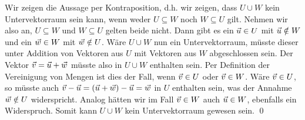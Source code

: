 \documentclass{article}
\begin{document}
\newpar
Wir zeigen die Aussage per Kontraposition, d.h. wir zeigen, dass $U \cup W$ kein Untervektorraum sein kann, wenn weder $U \subseteq W$ noch $W \subseteq U$ gilt.
\newpar
Nehmen wir also an, $U \subseteq W$ und $W \subseteq U$ gelten beide nicht. Dann gibt es ein $\vec{u} \in U$ mit $\vec{u} \notin W$ und ein $\vec{w} \in W$ mit $\vec{w} \notin U$.
\newpar
Wäre $U \cup W$ nun ein Untervektorraum, müsste dieser unter Addition von Vektoren aus $U$ mit Vektoren aus $W$ abgeschlossen sein. Der Vektor $\vec{v} = \vec{u} + \vec{w}$ müsste also in $U \cup W$ enthalten sein. Per Definition der Vereinigung von Mengen ist dies der Fall, wenn $\vec{v} \in U$ oder $\vec{v} \in W$.
\newpar
Wäre $\vec{v} \in U$, so müsste auch $\vec{v} - \vec{u} = (\vec{u} + \vec{w}) - \vec{u} = \vec{w}$ in $U$ enthalten sein, was der Annahme $\vec{w} \notin U$ widerspricht. Analog hätten wir im Fall $\vec{v} \in W$ auch $\vec{u} \in W$, ebenfalls ein Widerspruch. Somit kann $U \cup W$ kein Untervektorraum gewesen sein.
\qed
\clearpage
\end{document}
